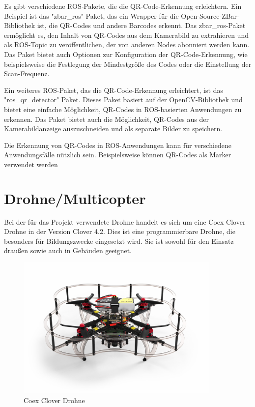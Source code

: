     Es gibt verschiedene \ac{ROS}-Pakete, die die QR-Code-Erkennung erleichtern. Ein Beispiel ist das "zbar\_ros" Paket, das ein Wrapper für die Open-Source-ZBar-Bibliothek ist, die QR-Codes und andere Barcodes erkennt. Das zbar\_ros-Paket ermöglicht es, den Inhalt von QR-Codes aus dem Kamerabild zu extrahieren und als \ac{ROS}-Topic zu veröffentlichen, der von anderen Nodes abonniert werden kann. Das Paket bietet auch Optionen zur Konfiguration der QR-Code-Erkennung, wie beispielsweise die Festlegung der Mindestgröße des Codes oder die Einstellung der Scan-Frequenz.

    Ein weiteres \ac{ROS}-Paket, das die QR-Code-Erkennung erleichtert, ist das "ros\_qr\_detector" Paket. Dieses Paket basiert auf der OpenCV-Bibliothek und bietet eine einfache Möglichkeit, QR-Codes in \ac{ROS}-basierten Anwendungen zu erkennen. Das Paket bietet auch die Möglichkeit, QR-Codes aus der Kamerabildanzeige auszuschneiden und als separate Bilder zu speichern.

    Die Erkennung von QR-Codes in \ac{ROS}-Anwendungen kann für verschiedene Anwendungsfälle nützlich sein. Beispielsweise können QR-Codes als Marker verwendet werden

\section{Drohne/Multicopter} \label{drohne:section}
Bei der für das Projekt verwendete Drohne handelt es sich um eine Coex Clover Drohne in der Version Clover 4.2. Dies ist eine programmierbare Drohne, die besonders für Bildungszwecke eingesetzt wird. Sie ist sowohl für den Einsatz draußen sowie auch in Gebäuden geeignet. \\

\begin{figure}[htpb]
    \centering
    \includegraphics[width=10cm,keepaspectratio,angle=0]{images/coex_clover.jpg}
    \caption[Coex Clover Drohne]{\label{img coex_clover} Coex Clover Drohne \cite{img_coex_clover}}
\end{figure}



